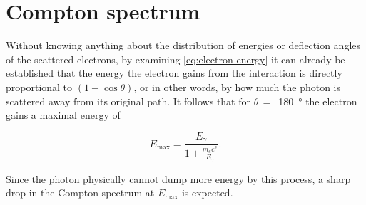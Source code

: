 
\section{Compton spectrum}
\label{sec:compton-spectrum}

Without knowing anything about the distribution of energies or deflection angles of 
the scattered electrons, by examining \autoref{eq:electron-energy} it can already be 
established that the energy the electron gains from the interaction is directly
proportional to $\left(1-\cos\theta\right)$, or in other words, by how much the 
photon is scattered away from its original path. It follows that for $\theta\,=\,$
\SI{180}{\degree} the electron gains a maximal energy of 

\begin{equation}
\label{eq:maximal-energy}
E_\text{max}=\frac{E_\gamma}{1+\frac{m_e c^2}{E_\gamma}}.
\end{equation}

Since the photon physically cannot dump more energy by this process, a sharp drop in
the Compton spectrum at $E_\text{max}$ is expected. 



